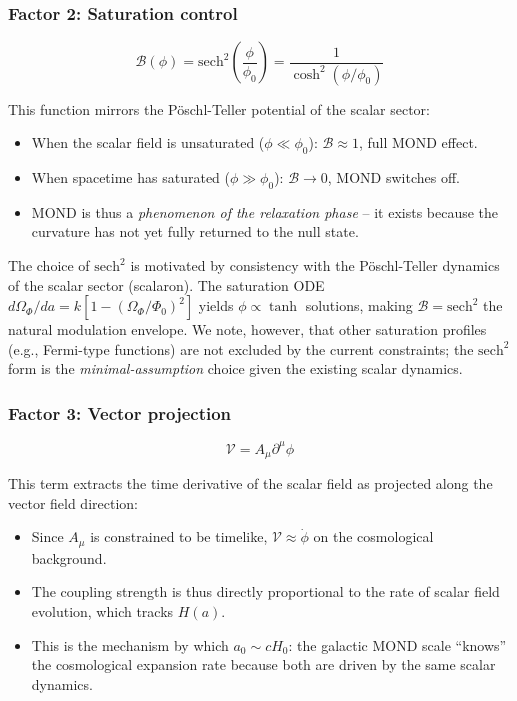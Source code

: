 \documentclass[aps,prd,twocolumn,superscriptaddress,nofootinbib]{revtex4-2}
\begin{document}
\subsubsection{Factor 2: Saturation control}

\begin{equation}
\mathcal{B}(\phi) = \mathrm{sech}^2\!\left(\frac{\phi}{\phi_0}\right) = \frac{1}{\cosh^2(\phi/\phi_0)}
\label{eq:B_phi}
\end{equation}

This function mirrors the P\"oschl-Teller potential of the scalar sector:
\begin{itemize}
\item When the scalar field is unsaturated ($\phi \ll \phi_0$): $\mathcal{B} \approx 1$, full MOND effect.
\item When spacetime has saturated ($\phi \gg \phi_0$): $\mathcal{B} \to 0$, MOND switches off.
\item MOND is thus a \textit{phenomenon of the relaxation phase} -- it exists because the curvature has not yet fully returned to the null state.
\end{itemize}

The choice of $\mathrm{sech}^2$ is motivated by consistency with the P\"oschl-Teller dynamics of the scalar sector (scalaron). The saturation ODE $d\Omega_\Phi/da = k[1 - (\Omega_\Phi/\Phi_0)^2]$ yields $\phi \propto \tanh$ solutions, making $\mathcal{B} = \mathrm{sech}^2$ the natural modulation envelope. We note, however, that other saturation profiles (e.g., Fermi-type functions) are not excluded by the current constraints; the $\mathrm{sech}^2$ form is the \textit{minimal-assumption} choice given the existing scalar dynamics.

\subsubsection{Factor 3: Vector projection}

\begin{equation}
\mathcal{V} = A_\mu \partial^\mu \phi
\label{eq:V_projection}
\end{equation}

This term extracts the time derivative of the scalar field as projected along the vector field direction:
\begin{itemize}
\item Since $A_\mu$ is constrained to be timelike, $\mathcal{V} \approx \dot{\phi}$ on the cosmological background.
\item The coupling strength is thus directly proportional to the rate of scalar field evolution, which tracks $H(a)$.
\item This is the mechanism by which $a_0 \sim cH_0$: the galactic MOND scale ``knows'' the cosmological expansion rate because both are driven by the same scalar dynamics.
\end{itemize}
\end{document}
